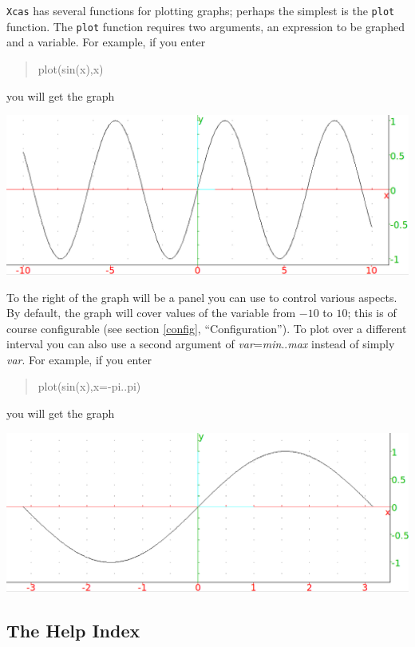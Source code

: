 \documentclass{article}
\newcommand{\xcasin}[1]
{\begin{quote}\ttfamily
#1
\end{quote}}
\begin{document}
\texttt{Xcas} has several functions for plotting graphs; perhaps the
simplest is the \texttt{plot} function.  
The \texttt{plot} function requires two arguments, an expression to be
graphed and a variable. For example, if you enter
\xcasin{plot(sin(x),x)}
you will get the graph
\begin{center}
\includegraphics[width=\textwidth]{xcas-sinplot.png}
\end{center}
To the right of the graph will be a panel you can use to control
various aspects.  By default, the graph will cover values of the
variable from $-10$ to $10$; this is of course configurable (see
section \ref{config}, ``Configuration'').  To plot
over a different interval you can also use a second argument of 
\textit{var}=\textit{min}..\textit{max} instead of simply
\textit{var}.  For example, if you enter
\xcasin{plot(sin(x),x=-pi..pi)}
you will get the graph
\begin{center}
\includegraphics[width=\textwidth]{xcas-sinplot2.png}
\end{center}

\subsection{The Help Index}
\end{document}
